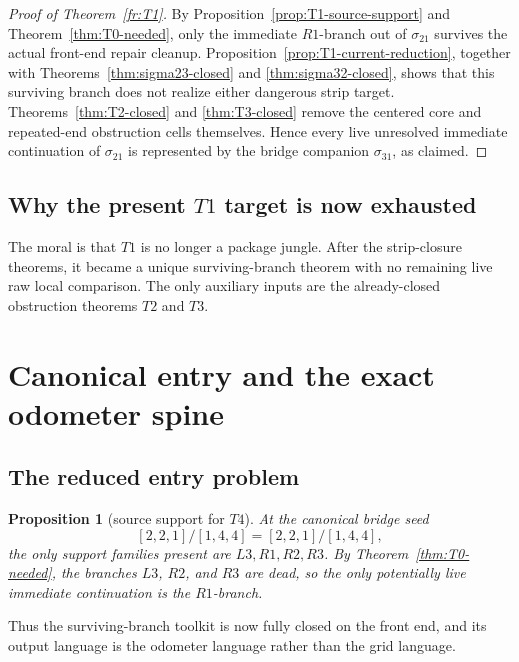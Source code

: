 \documentclass[11pt]{article}
\newtheorem{proposition}[theorem]{Proposition}
\newcommand{\sig}[2]{\sigma_{#1#2}}
\newcommand{\CanL}{[2,2,1]}
\newcommand{\CanR}{[1,4,4]}
\newcommand{\CanSeed}{\CanL/\CanR}
\begin{document}
\begin{proof}[Proof of Theorem~\ref{fr:T1}]
By Proposition~\ref{prop:T1-source-support} and Theorem~\ref{thm:T0-needed},
only the immediate \(R1\)-branch out of \(\sig21\) survives the actual front-end
repair cleanup.  Proposition~\ref{prop:T1-current-reduction}, together with
Theorems~\ref{thm:sigma23-closed} and \ref{thm:sigma32-closed}, shows that this
surviving branch does not realize either dangerous strip target.
Theorems~\ref{thm:T2-closed} and \ref{thm:T3-closed} remove the centered core
and repeated-end obstruction cells themselves.  Hence every live unresolved
immediate continuation of \(\sig21\) is represented by the bridge companion
\(\sig31\), as claimed.
\end{proof}

\subsection{\texorpdfstring{Why the present \(T1\) target is now exhausted}{Why the present T1 target is now exhausted}}

The moral is that \(T1\) is no longer a package jungle.
After the strip-closure theorems, it became a unique surviving-branch theorem
with no remaining live raw local comparison.  The only auxiliary inputs are the
already-closed obstruction theorems \(T2\) and \(T3\).

\section{Canonical entry and the exact odometer spine}

\subsection{The reduced entry problem}

\begin{proposition}[source support for \(T4\)]
\label{prop:T4-source-support}
At the canonical bridge seed
\[
\CanSeed=\CanL/\CanR,
\]
the only support families present are \(L3,R1,R2,R3\).
By Theorem~\ref{thm:T0-needed}, the branches \(L3\), \(R2\), and \(R3\) are
dead, so the only potentially live immediate continuation is the \(R1\)-branch.
\end{proposition}

Thus the surviving-branch toolkit is now fully closed on the front end, and
its output language is the odometer language rather than the grid language.
\end{document}

